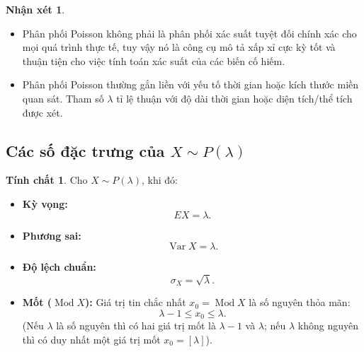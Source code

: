 \documentclass[12pt,a4paper]{article}
\theoremstyle{definition}
\newtheorem{nhanxet}{Nhận xét}[section]
\newtheorem{tinhchat}{Tính chất}[section]
\begin{document}
\begin{nhanxet}
\begin{itemize}
    \item Phân phối Poisson không phải là phân phối xác suất tuyệt đối chính xác cho mọi quá trình thực tế, tuy vậy nó là công cụ mô tả xấp xỉ cực kỳ tốt và thuận tiện cho việc tính toán xác suất của các biến cố hiếm.
    \item Phân phối Poisson thường gắn liền với yếu tố thời gian hoặc kích thước miền quan sát. Tham số $\lambda$ tỉ lệ thuận với độ dài thời gian hoặc diện tích/thể tích được xét.
\end{itemize}
\end{nhanxet}

\subsection{Các số đặc trưng của \texorpdfstring{$X \sim P(\lambda)$}{X ~ P(lambda)}}

\begin{tinhchat}
Cho $X \sim P(\lambda)$, khi đó:
\begin{itemize}
    \item \textbf{Kỳ vọng:}
    \[
    EX = \lambda.
    \]
    \item \textbf{Phương sai:}
    \[
    \operatorname{Var} X = \lambda.
    \]
    \item \textbf{Độ lệch chuẩn:}
    \[
    \sigma_X = \sqrt{\lambda}.
    \]
    \item \textbf{Mốt ($\operatorname{Mod} X$):} Giá trị tin chắc nhất $x_0 = \operatorname{Mod} X$ là số nguyên thỏa mãn:
    \[
    \lambda - 1 \le x_0 \le \lambda.
    \]
    (Nếu $\lambda$ là số nguyên thì có hai giá trị mốt là $\lambda - 1$ và $\lambda$; nếu $\lambda$ không nguyên thì có duy nhất một giá trị mốt $x_0 = [\lambda]$).
\end{itemize}
\end{tinhchat}
\end{document}
